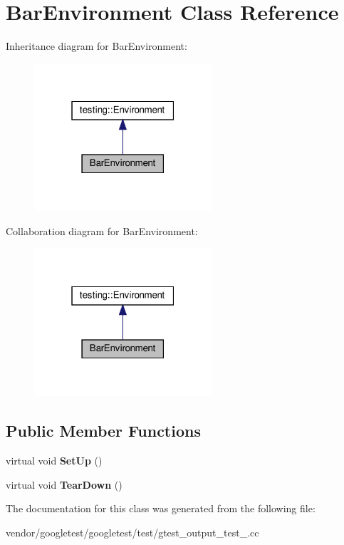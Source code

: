 \hypertarget{class_bar_environment}{}\section{Bar\+Environment Class Reference}
\label{class_bar_environment}


Inheritance diagram for Bar\+Environment\+:
\nopagebreak
\begin{figure}[H]
\begin{center}
\leavevmode
\includegraphics[width=187pt]{class_bar_environment__inherit__graph}
\end{center}
\end{figure}


Collaboration diagram for Bar\+Environment\+:
\nopagebreak
\begin{figure}[H]
\begin{center}
\leavevmode
\includegraphics[width=187pt]{class_bar_environment__coll__graph}
\end{center}
\end{figure}
\subsection*{Public Member Functions}
\begin{DoxyCompactItemize}
\item 
\mbox{\label{class_bar_environment_a88e17c5dd1dcea7a4538f2f3c6bf7bdd}} 
virtual void {\bfseries Set\+Up} ()
\item 
\mbox{\label{class_bar_environment_a384f951da72a2a18bb0c2b3506376b09}} 
virtual void {\bfseries Tear\+Down} ()
\end{DoxyCompactItemize}


The documentation for this class was generated from the following file\+:\begin{DoxyCompactItemize}
\item 
vendor/googletest/googletest/test/gtest\+\_\+output\+\_\+test\+\_\+.\+cc\end{DoxyCompactItemize}
